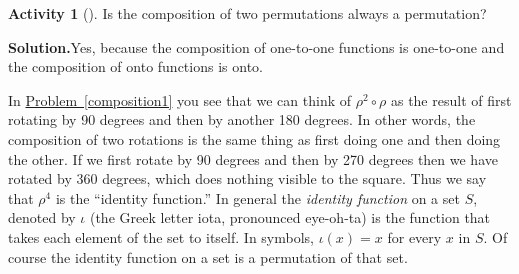 \documentclass[10pt,]{book}
\theoremstyle{plain}
\theoremstyle{definition}
\newtheorem{activity}[project]{Activity}
\numberwithin{equation}{chapter}
\begin{document}
\begin{activity}[]\label{activity-236}
Is the composition of two permutations always a permutation?%
\par\medskip\noindent%
\textbf{Solution.}\quad Yes, because the composition of one-to-one functions is one-to-one and the composition of onto functions is onto.%
\end{activity}
In \hyperref[composition1]{Problem~\ref{composition1}} you see that we can think of \(\rho^2\circ\rho\) as the result of first rotating by 90 degrees and then by another 180 degrees. In other words, the composition of two rotations is the same thing as first doing one and then doing the other. If we first rotate by 90 degrees and then by 270 degrees then we have rotated by 360 degrees, which does nothing visible to the square. Thus we say that \(\rho^4\) is the ``identity function.'' In general the \emph{identity function} on a set \(S\), denoted by \(\iota\) (the Greek letter iota, pronounced eye-oh-ta) is the function that takes each element of the set to itself. In symbols, \(\iota(x) =x\) for every \(x\) in \(S\). Of course the identity function on a set is a permutation of that set.%
\typeout{************************************************}
\typeout{************************************************}
\end{document}
